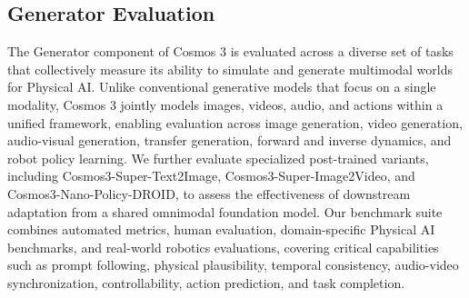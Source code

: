 \subsection{Generator Evaluation}

The Generator component of Cosmos 3 is evaluated across a diverse set of tasks that collectively measure its ability to simulate and generate multimodal worlds for Physical AI. Unlike conventional generative models that focus on a single modality, Cosmos 3 jointly models images, videos, audio, and actions within a unified framework, enabling evaluation across image generation, video generation, audio-visual generation, transfer generation, forward and inverse dynamics, and robot policy learning. We further evaluate specialized post-trained variants, including Cosmos3-Super-Text2Image, Cosmos3-Super-Image2Video, and Cosmos3-Nano-Policy-DROID, to assess the effectiveness of downstream adaptation from a shared omnimodal foundation model. Our benchmark suite combines automated metrics, human evaluation, domain-specific Physical AI benchmarks, and real-world robotics evaluations, covering critical capabilities such as prompt following, physical plausibility, temporal consistency, audio-video synchronization, controllability, action prediction, and task completion.


\FloatBarrier

\FloatBarrier

\FloatBarrier

\FloatBarrier

\FloatBarrier
